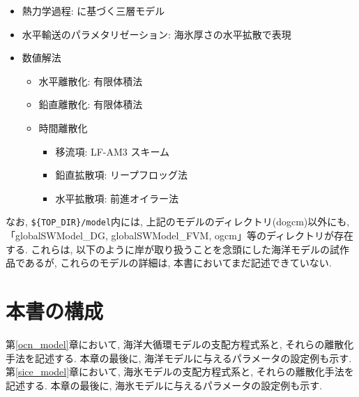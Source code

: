 \begin{itemize}
  \item 熱力学過程: \citep{winton2000reformulated}に基づく三層モデル
  \item 水平輸送のパラメタリゼーション: 海氷厚さの水平拡散で表現
  \item 数値解法
  \begin{itemize}
    \item 水平離散化: 有限体積法
    \item 鉛直離散化: 有限体積法
    \item 時間離散化
    \begin{itemize}  
      \item 移流項: LF-AM3 スキーム \citep{shchepetkin2005regional}
  	  \item 鉛直拡散項: リープフロッグ法
  	  \item 水平拡散項: 前進オイラー法
    \end{itemize}                  
  \end{itemize}
\end{itemize}

なお, \verb|${TOP_DIR}/model|内には, 上記のモデルのディレクトリ(dogcm)以外にも, 
「globalSWModel\_DG, globalSWModel\_FVM, ogcm」等のディレクトリが存在する. 
これらは, 以下のように岸が取り扱うことを念頭にした海洋モデルの試作品であるが, 
これらのモデルの詳細は, 本書においてまだ記述できていない.  

\section{本書の構成}
第\ref{ocn_model}章において, 海洋大循環モデルの支配方程式系と, 
それらの離散化手法を記述する. 本章の最後に, 海洋モデルに与えるパラメータの設定例も示す. 
第\ref{sice_model}章において, 海氷モデルの支配方程式系と, 
それらの離散化手法を記述する. 本章の最後に, 海氷モデルに与えるパラメータの設定例も示す. 



